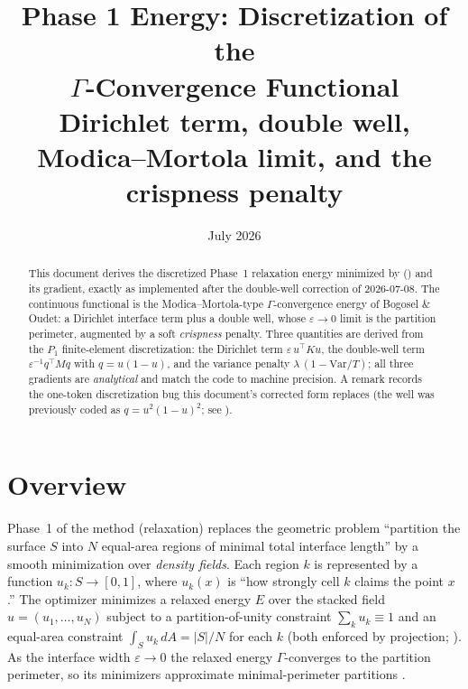\documentclass[11pt,a4paper]{article}
\title{\textbf{Phase 1 Energy: Discretization of the \\ $\Gamma$-Convergence Functional}\\[0.5em]
  \large Dirichlet term, double well, Modica--Mortola limit, and the crispness penalty}
\author{}
\date{July 2026}
\begin{document}
\maketitle

\begin{abstract}
This document derives the discretized Phase~1 relaxation energy minimized by
 () and
its gradient, exactly as implemented after the double-well correction of
2026-07-08. The continuous functional is the Modica--Mortola-type
$\Gamma$-convergence energy of Bogosel \& Oudet: a Dirichlet interface term plus a
double well, whose $\varepsilon\to0$ limit is the partition perimeter, augmented by a
soft \emph{crispness} penalty. Three quantities are derived from the $P_1$ finite-element
discretization: the Dirichlet term $\varepsilon\,u^\top K u$, the double-well term
$\varepsilon^{-1} q^\top M q$ with $q=u(1-u)$, and the variance penalty
$\lambda\,(1-\mathrm{Var}/T)$; all three gradients are \emph{analytical} and match the
code to machine precision. A remark records the one-token discretization bug this
document's corrected form replaces (the well was previously coded as
$q=u^2(1-u)^2$; see ).
\end{abstract}

\tableofcontents
\newpage

\section{Overview}
\label{sec:overview}

Phase~1 of the method (relaxation) replaces the geometric problem ``partition the
surface $S$ into $N$ equal-area regions of minimal total interface length'' by a
smooth minimization over \emph{density fields}. Each region $k$ is represented by a
function $u_k : S \to [0,1]$, where $u_k(x)$ is ``how strongly cell $k$ claims the
point $x$.'' The optimizer minimizes a relaxed energy $E$ over the stacked field
$u = (u_1,\dots,u_N)$ subject to a partition-of-unity constraint
$\sum_k u_k \equiv 1$ and an equal-area constraint $\int_S u_k \,dA = |S|/N$ for
each $k$ (both enforced by projection; ).
As the interface width $\varepsilon \to 0$ the relaxed energy $\Gamma$-converges to
the partition perimeter, so its minimizers approximate minimal-perimeter partitions
\cite{bogosel2017partitions,modica1987gradient}.
\end{document}

